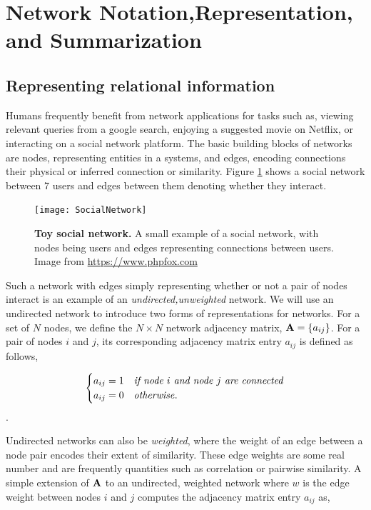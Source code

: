 \section{Network Notation,Representation, and Summarization}

\subsection{Representing relational information}

Humans frequently benefit from network applications for tasks such as, viewing relevant queries from a google search, enjoying a suggested movie on Netflix, or interacting on a social network platform. The basic building blocks of networks are nodes, representing entities in a systems, and edges, encoding connections their physical or inferred connection or similarity. Figure \ref{fig:social} shows a social network between 7 users and edges between them denoting whether they interact. 
\begin{figure}
\begin{center}
\texttt{[image: SocialNetwork]}
\caption{{\bf Toy social network.} A small example of a social network, with nodes being users and edges representing connections between users. Image from \url{https://www.phpfox.com}}
\label{fig:social}
\end{center}
\end{figure}

Such a network with edges simply representing whether or not a pair of nodes interact is an example of an \emph{undirected,unweighted} network. We will use an undirected network to introduce two forms of representations for networks. For a set of $N$ nodes, we define the $N \times N$ network adjacency matrix, ${\bf A}=\{a_{ij}\}$. For a pair of nodes $i$ and $j$, its corresponding adjacency matrix entry $a_{ij}$ is defined as follows,

\[ \begin{cases} 
     a_{ij}=1 & \text{\emph{if node $i$ and node $j$ are connected}} \\
      a_{ij}=0 & \text{\emph{otherwise}}.
         \end{cases}
\].

Undirected networks can also be \emph{weighted}, where the weight of an edge between a node pair encodes their extent of similarity. These edge weights are some real number and are frequently quantities such as correlation or pairwise similarity. A simple extension of ${\bf A}$ to an undirected, weighted network where $w$ is the edge weight between nodes $i$ and $j$ computes the adjacency matrix entry $a_{ij}$ as, 

